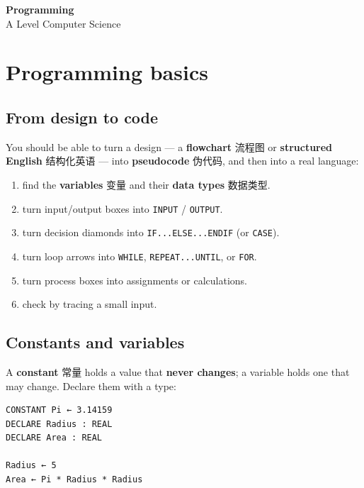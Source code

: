 \documentclass[11pt]{article}
\begin{document}
\begin{center}
  {\LARGE\bfseries Programming}\\[0.35em]
  {\large A Level Computer Science}
\end{center}
\vspace{0.6em}

\section*{Programming basics}

\subsection*{From design to code}

You should be able to turn a design — a \textbf{flowchart} 流程图 or \textbf{structured English} 结构化英语 — into \textbf{pseudocode} 伪代码, and then into a real language:

\begin{enumerate}
\item find the \textbf{variables} 变量 and their \textbf{data types} 数据类型.

\item turn input/output boxes into \texttt{INPUT} / \texttt{OUTPUT}.

\item turn decision diamonds into \texttt{IF...ELSE...ENDIF} (or \texttt{CASE}).

\item turn loop arrows into \texttt{WHILE}, \texttt{REPEAT...UNTIL}, or \texttt{FOR}.

\item turn process boxes into assignments or calculations.

\item check by tracing a small input.

\end{enumerate}

\subsection*{Constants and variables}

A \textbf{constant} 常量 holds a value that \textbf{never changes}; a variable holds one that may change. Declare them with a type:

\begin{Verbatim}
CONSTANT Pi ← 3.14159
DECLARE Radius : REAL
DECLARE Area : REAL

Radius ← 5
Area ← Pi * Radius * Radius
\end{Verbatim}
\end{document}
